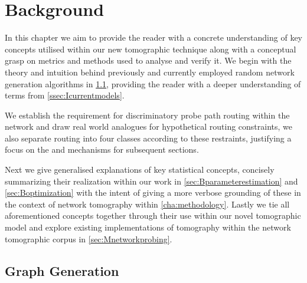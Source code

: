 \chapter{Background}
\label{cha:background}

In this chapter we aim to provide the reader with a concrete understanding of key concepts utilised within our new tomographic technique along with a conceptual grasp on metrics and methods used to analyse and verify it. We begin with the theory and intuition behind previously and currently employed random network generation algorithms in \cref{sec:Bgraphgeneration}, providing the reader with a deeper understanding of terms from \cref{ssec:Icurrentmodels}.\par
We establish the requirement for discriminatory probe path routing within the network and draw real world analogues for hypothetical routing constraints, we also separate routing into four classes according to these restraints, justifying a focus on the \cbr and \cfr mechanisms for subsequent sections.\par
Next we give generalised explanations of key statistical concepts, concisely summarizing their realization within our work in \cref{sec:Bparameterestimation} and \cref{sec:Boptimization} with the intent of giving a more verbose grounding of these in the context of network tomography within \cref{cha:methodology}. Lastly we tie all aforementioned concepts together through their use within our novel tomographic model and explore existing implementations of \pdv tomography within the network tomographic corpus in \cref{sec:Mnetworkprobing}.

\section{Graph Generation}
\label{sec:Bgraphgeneration}

